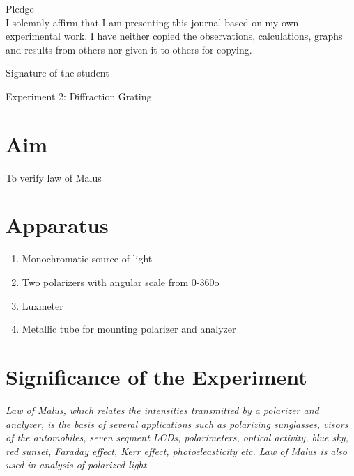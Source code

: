 \documentclass[11pt]{article}
\begin{document}
	\begin{center}
	{\Large Pledge}\\
	\vspace{0.5cm}
	I solemnly affirm that I am presenting this journal based on my own experimental work. I have neither copied the observations, calculations, graphs and results from others nor given it to others for copying.\\
		\end{center}
	
	\vspace{0.5cm}
	
    \begin{flushright}
	{\large Signature of the student}\\
	\vspace{1cm}
	 \end{flushright}
	
	
	
	\begin{center}
		{\LARGE Experiment 2: Diffraction Grating}\\
	\end{center}

	\section{Aim}
	\noindent
To verify law of Malus
	
	\section{Apparatus}


		\begin{enumerate}
			\item Monochromatic source of light
			\item Two polarizers with angular scale from 0-360o
			\item Luxmeter
			\item Metallic tube for mounting polarizer and analyzer
		\end{enumerate}


	\section{Significance of the Experiment}
\textit{Law of Malus, which relates the intensities transmitted by a
polarizer and analyzer, is the basis of several applications such as polarizing sunglasses, visors
of the automobiles, seven segment LCDs, polarimeters, optical activity, blue sky, red sunset,
Faraday effect, Kerr effect, photoeleasticity etc. Law of Malus is also used in analysis of
polarized light}
	
\end{document}

